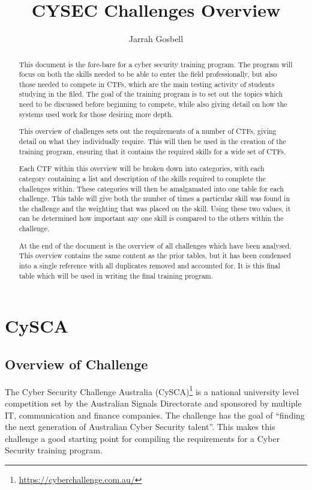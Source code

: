 \documentclass[a4paper,11pt]{report}
\author{Jarrah Gosbell}
\title{CYSEC Challenges Overview}
\begin{document}
\maketitle
\tableofcontents
\begin{abstract}
	This document is the fore-bare for a cyber security training program. 
	The program will focus on both the skills needed to be able to enter the field professionally, but also those needed to compete in CTFs, which are the main testing activity of students studying in the filed. 
	The goal of the training program is to set out the topics which need to be discussed before beginning to compete, 
	while also giving detail on how the systems used work for those desiring more depth. 

	This overview of challenges sets out the requirements of a number of CTFs, giving detail on what they individually require. 
	This will then be used in the creation of the training program, ensuring that it contains the required skills for a wide set of CTFs. 

	Each CTF within this overview will be broken down into categories, with each category containing a list and description of the skills required to complete the challenges within. 
	These categories will then be amalgamated into one table for each challenge. 
	This table will give both the number of times a particular skill was found in the challenge and the weighting that was placed on the skill. 
	Using these two values, it can be determined how important any one skill is compared to the others within the challenge. 

	At the end of the document is the overview of all challenges which have been analysed. 
	This overview contains the same content as the prior tables, but it has been condensed into a single reference with all duplicates removed and accounted for. 
	It is this final table which will be used in writing the final training program. 
\end{abstract}
\chapter{CySCA}
	\section{Overview of Challenge}
		The Cyber Security Challenge Australia (CySCA)\footnote{\url{https://cyberchallenge.com.au/}} is a national university level competition set by the Australian Signals Directorate 
		and sponsored by multiple IT, communication and finance companies. 
		The challenge has the goal of ``finding the next generation of Australian Cyber Security talent''.
		This makes this challenge a good starting point for compiling the requirements for a Cyber Security training program. 
\end{document}
